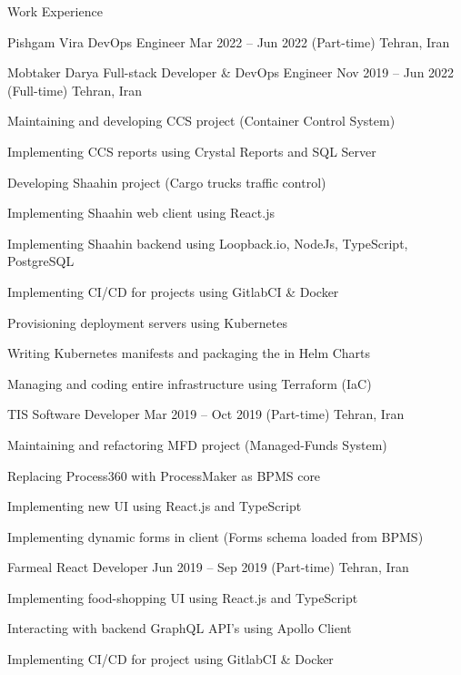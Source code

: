 \documentclass[]{main}
\begin{document}
\begin{section}{Work Experience}
\begin{subsection}{ Pishgam Vira }{ DevOps Engineer }{ Mar 2022 -- Jun 2022 (Part-time) }{ Tehran, Iran }
            \end{subsection}
    \begin{subsection}{ Mobtaker Darya }{ Full-stack Developer \& DevOps Engineer }{ Nov 2019 -- Jun 2022 (Full-time) }{ Tehran, Iran }
            \item Maintaining and developing CCS project (Container Control System) 
            \item Implementing CCS reports using Crystal Reports and SQL Server 
            \item Developing Shaahin project (Cargo trucks traffic control) 
            \item Implementing Shaahin web client using React.js 
            \item Implementing Shaahin backend using Loopback.io, NodeJs, TypeScript, PostgreSQL 
            \item Implementing CI/CD for projects using GitlabCI \& Docker 
            \item Provisioning deployment servers using Kubernetes 
            \item Writing Kubernetes manifests and packaging the in Helm Charts 
            \item Managing and coding entire infrastructure using Terraform (IaC) 
            \end{subsection}
    \begin{subsection}{ TIS }{ Software Developer }{ Mar 2019 -- Oct 2019 (Part-time) }{ Tehran, Iran }
            \item Maintaining and refactoring MFD project (Managed-Funds System) 
            \item Replacing Process360 with ProcessMaker as BPMS core 
            \item Implementing new UI using React.js and TypeScript 
            \item Implementing dynamic forms in client (Forms schema loaded from BPMS) 
            \end{subsection}
    \begin{subsection}{ Farmeal }{ React Developer }{ Jun 2019 -- Sep 2019 (Part-time) }{ Tehran, Iran }
            \item Implementing food-shopping UI using React.js and TypeScript 
            \item Interacting with backend GraphQL API's using Apollo Client 
            \item Implementing CI/CD for project using GitlabCI \& Docker 
            \end{subsection}

\end{section}
\end{document}
